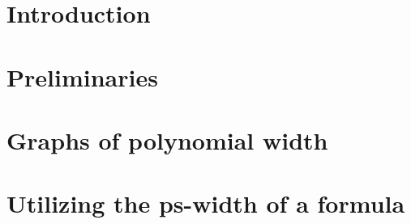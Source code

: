 \documentclass{article}
\begin{document}
\section{Introduction}




\section{Preliminaries}





\section{Graphs of polynomial width}





\section{Utilizing the ps-width of a formula}






\end{document}

